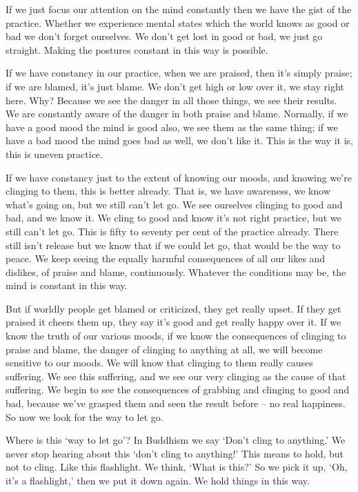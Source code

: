 If we just focus our attention on the mind constantly then we have the gist of the practice. Whether we experience mental states which the world knows as good or bad we don't forget ourselves. We don't get lost in good or bad, we just go straight. Making the postures constant in this way is possible.

If we have constancy in our practice, when we are praised, then it's simply praise; if we are blamed, it's just blame. We don't get high or low over it, we stay right here. Why? Because we see the danger in all those things, we see their results. We are constantly aware of the danger in both praise and blame. Normally, if we have a good mood the mind is good also, we see them as the same thing; if we have a bad mood the mind goes bad as well, we don't like it. This is the way it is, this is uneven practice.

If we have constancy just to the extent of knowing our moods, and knowing we're clinging to them, this is better already. That is, we have awareness, we know what's going on, but we still can't let go. We see ourselves clinging to good and bad, and we know it. We cling to good and know it's not right practice, but we still can't let go. This is fifty to seventy per cent of the practice already. There still isn't release but we know that if we could let go, that would be the way to peace. We keep seeing the equally harmful consequences of all our likes and dislikes, of praise and blame, continuously. Whatever the conditions may be, the mind is constant in this way.

But if worldly people get blamed or criticized, they get really upset. If they get praised it cheers them up, they say it's good and get really happy over it. If we know the truth of our various moods, if we know the consequences of clinging to praise and blame, the danger of clinging to anything at all, we will become sensitive to our moods. We will know that clinging to them really causes suffering. We see this suffering, and we see our very clinging as the cause of that suffering. We begin to see the consequences of grabbing and clinging to good and bad, because we've grasped them and seen the result before -- no real happiness. So now we look for the way to let go.

Where is this `way to let go'? In Buddhism we say `Don't cling to anything.' We never stop hearing about this `don't cling to anything!' This means to hold, but not to cling. Like this flashlight. We think, `What is this?' So we pick it up, `Oh, it's a flashlight,' then we put it down again. We hold things in this way.

